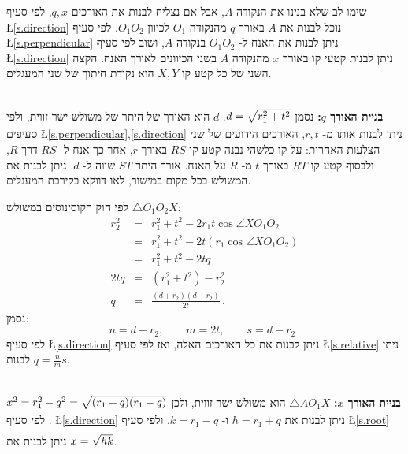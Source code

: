 \documentclass[12pt,a4paper]{article}
\newcommand*{\disfrac}[2]{\displaystyle\frac{#1}{#2}}
\begin{document}
שימו לב שלא בנינו את הנקודה
$A$,
אבל אם נצליח לבנות את האורכים
$q,x$,
לפי סעיף
\L{\ref{s.direction}}
נוכל לבנות את 
$A$
באורך
$q$
מהנקודה
$O_1$
לכיוון
$O_1O_2$.
לפי סעיף
\L{\ref{s.perpendicular}}
ניתן לבנות את האנח ל-%
$O_1O_2$
בנקודה
$A$,
ושוב לפי סעיף
\L{\ref{s.direction}}
ניתן לבנות קטעי קו באורך
$x$
מהנקודה
$A$
בשני הכיוונים לאורך האנח. הקצה השני של כל קטע קו
$X,Y$
הוא נקודת חיתוך של שני המעגלים.

\textbf{%
בניית האורך
$q$:}
נסמן
$\rule[-5pt]{0pt}{30pt}d=\sqrt{r_1^2+t^2}$.
$d$
הוא האורך של היתר של משולש ישר זווית, ולפי סעיפים
\L{\ref{s.perpendicular},\ref{s.direction}}
ניתן לבנות אותו מ-%
$r,t$,
האורכים הידועים של שני הצלעות האחרות: על קו כלשהי נבנה קטע קו
$RS$
באורך
$r$,
אחר כך אנח ל-%
$RS$
דרך
$R$,
ולבסוף קטע קו
$RT$
באורך 
$t$
מ-%
$R$
על האנח. אורך היתר
$ST$
שווה ל-%
$d$.
ניתן לבנות את המשולש בכל מקום במישור, לאו דווקא בקירבת המעגלים.

לפי חוק הקוסינוסים במשולש
$\triangle O_1O_2X$:
\vspace*{-8pt}
\[
\renewcommand*{\arraystretch}{1.8}
\begin{array}{rcl}
r_2^2 &=& r_1^2 + t^2 - 2r_1t\cos\angle XO_1O_2\\
      &=& r_1^2 + t^2 - 2t(r_1\cos\angle XO_1O_2)\\
&=& r_1^2 + t^2 - 2tq\\
2tq &=& (r_1^2+t^2) - r_2^2\\
q&=&\disfrac{(d+r_2)(d-r_2)}{2t}\,.
\end{array}
\]
נסמן:
\[
n= d+ r_2, \quad\quad m= 2t,\quad\quad s =d -r_2\,.
\]
לפי סעיף
\L{\ref{s.direction}}
ניתן לבנות את כל האורכים האלה, ואז לפי סעיף
\L{\ref{s.relative}}
ניתן לבנות
$q=\frac{n}{m}s$.

\textbf{%
בניית האורך
$x$:}
$\triangle AO_1X$
הוא משולש ישר זווית, ולכן
$\rule[-5pt]{0pt}{30pt}x^2=r_1^2-q^2 =\sqrt{(r_1+q)(r_1-q)}$.
לפי סעיף
\L{\ref{s.direction}}
ניתן לבנות את
$h =r_1+ q$
ו-%
$k= r_1 - q$,
ולפי סעיף
\L{\ref{s.root}}
ניתן לבנות את
$\rule[-5pt]{0pt}{20pt}x= \sqrt{hk}$. 
\end{document}
